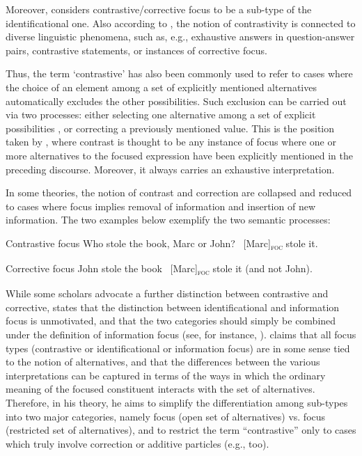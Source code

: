 Moreover, \textcite{kiss1998identificational} considers contrastive/corrective focus to be a sub-type of the identificational one.
Also according to \textcite{tomioka2008information}, the notion of contrastivity is connected to diverse linguistic phenomena, such as, e.g., exhaustive answers in question-answer pairs, contrastive statements, or instances of corrective focus. 

Thus, the term `contrastive' has also been commonly used to refer to cases where the choice of an element among a set of explicitly mentioned alternatives automatically excludes the other possibilities. Such exclusion can be carried out via two processes: either selecting one alternative among a set of explicit possibilities \parencite{dik1981typology}, or correcting a previously mentioned value. This is the position taken by \textcite{chafe1976givenness}, where contrast is thought to be any instance of focus where one or more alternatives to the focused expression have been explicitly mentioned in the preceding discourse. Moreover, it always carries an exhaustive interpretation. 

In some theories, the notion of contrast and correction are collapsed and reduced to cases where focus implies removal of information and insertion of new information. The two examples below exemplify the two semantic processes:

\ea \label{ex:1:8}  {Contrastive focus}
\ea Who stole the book, Marc or John?
\ex \ [Marc]\textsubscript{\textsc{foc}} \normalsize stole it.
\z \z 

\ea \label{ex:1:9} {Corrective focus}
\ea John stole the book
\ex  \ [Marc]\textsubscript{\textsc{foc}} \normalsize{stole it (and not John)}.
\z \z

While some scholars advocate a further distinction between contrastive and corrective, \textcite{krifka2008basic} states that the distinction between identificational and information focus is unmotivated, and that the two categories should simply be combined under the definition of information focus (see, for instance, \cite{vallduvi1992informational}).
\textcite{krifka2008basic} claims that all focus types (contrastive or identificational or information focus) are in some sense tied to the notion of alternatives, and that the differences between the various interpretations can be captured in terms of the ways in which the ordinary meaning of the focused constituent interacts with the set of alternatives. Therefore, in his theory, he aims to simplify the differentiation among sub-types into  two major categories, namely  focus (open set of alternatives) vs.  focus (restricted set of alternatives), and to restrict the term ``contrastive” only to cases which truly involve correction or additive particles (e.g., too).

